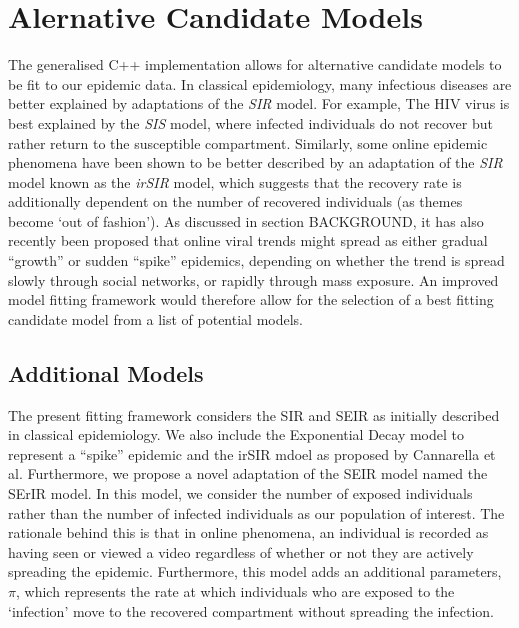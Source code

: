 \section{Alernative Candidate Models}

The generalised C++ implementation allows for alternative candidate
models to be fit to our epidemic data. In classical epidemiology, many
infectious diseases are better explained by adaptations of the
\emph{SIR} model. For example, The HIV virus is best explained by the
\emph{SIS} model, where infected individuals do not recover but rather
return to the susceptible compartment.\cite{vynnycky} Similarly, some online epidemic
phenomena have been shown to be better described by an adaptation of
the \emph{SIR} model known as the \emph{irSIR} model, which suggests
that the recovery rate is additionally dependent on the number of
recovered individuals (as themes become `out of
fashion').\cite{cannarella} As discussed in section BACKGROUND, it has
also recently been proposed that online viral trends might spread as either gradual
``growth'' or sudden ``spike'' epidemics, depending on whether the
trend is spread slowly through social networks, or rapidly through
mass exposure. An improved model fitting framework would
therefore allow for the selection of a best fitting candidate model
from a list of potential models.

\subsection{Additional Models}
The present fitting framework considers the SIR and SEIR as initially described
in classical epidemiology.\cite{vynnycky} We also include the Exponential Decay model
to represent a ``spike'' epidemic and the irSIR mdoel as proposed by
Cannarella et al.\cite{cannarella} Furthermore, we propose a novel
adaptation of the SEIR model named the SErIR model. In this model, we
consider the number of exposed individuals rather than the number of
infected individuals as our population of interest. The rationale
behind this is that in
online phenomena, an individual is recorded as having seen or viewed a
video regardless of whether or not they are actively spreading the
epidemic. Furthermore, this model adds an additional parameters,
$\pi$, which represents the rate at which individuals who are exposed
to the `infection' move to the recovered compartment without spreading the infection.

